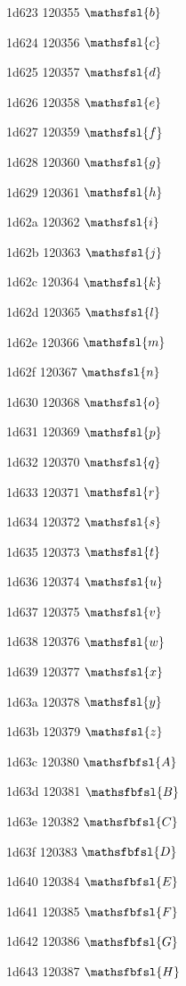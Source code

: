 \documentclass[11pt]{article}
\begin{document}
1d623 120355 \ensuremath{\mathsfsl{b}}

1d624 120356 \ensuremath{\mathsfsl{c}}

1d625 120357 \ensuremath{\mathsfsl{d}}

1d626 120358 \ensuremath{\mathsfsl{e}}

1d627 120359 \ensuremath{\mathsfsl{f}}

1d628 120360 \ensuremath{\mathsfsl{g}}

1d629 120361 \ensuremath{\mathsfsl{h}}

1d62a 120362 \ensuremath{\mathsfsl{i}}

1d62b 120363 \ensuremath{\mathsfsl{j}}

1d62c 120364 \ensuremath{\mathsfsl{k}}

1d62d 120365 \ensuremath{\mathsfsl{l}}

1d62e 120366 \ensuremath{\mathsfsl{m}}

1d62f 120367 \ensuremath{\mathsfsl{n}}

1d630 120368 \ensuremath{\mathsfsl{o}}

1d631 120369 \ensuremath{\mathsfsl{p}}

1d632 120370 \ensuremath{\mathsfsl{q}}

1d633 120371 \ensuremath{\mathsfsl{r}}

1d634 120372 \ensuremath{\mathsfsl{s}}

1d635 120373 \ensuremath{\mathsfsl{t}}

1d636 120374 \ensuremath{\mathsfsl{u}}

1d637 120375 \ensuremath{\mathsfsl{v}}

1d638 120376 \ensuremath{\mathsfsl{w}}

1d639 120377 \ensuremath{\mathsfsl{x}}

1d63a 120378 \ensuremath{\mathsfsl{y}}

1d63b 120379 \ensuremath{\mathsfsl{z}}

1d63c 120380 \ensuremath{\mathsfbfsl{A}}

1d63d 120381 \ensuremath{\mathsfbfsl{B}}

1d63e 120382 \ensuremath{\mathsfbfsl{C}}

1d63f 120383 \ensuremath{\mathsfbfsl{D}}

1d640 120384 \ensuremath{\mathsfbfsl{E}}

1d641 120385 \ensuremath{\mathsfbfsl{F}}

1d642 120386 \ensuremath{\mathsfbfsl{G}}

1d643 120387 \ensuremath{\mathsfbfsl{H}}
\end{document}

